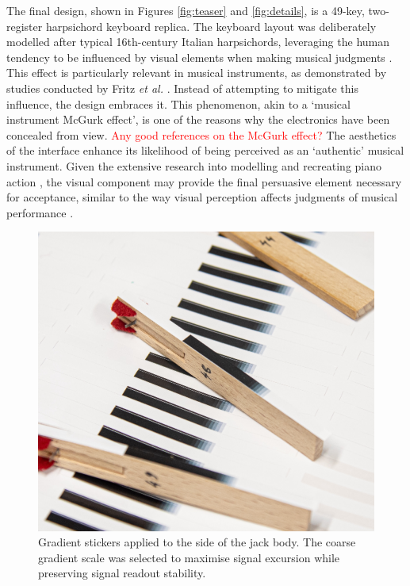 The final design, shown in Figures \ref{fig:teaser} and \ref{fig:details}, is a 49-key, two-register harpsichord keyboard replica. The keyboard layout was deliberately modelled after typical 16th-century Italian harpsichords, leveraging the human tendency to be influenced by visual elements when making musical judgments \cite{Tsay2013}. This effect is particularly relevant in musical instruments, as demonstrated by studies conducted by Fritz \emph{et al.} \cite{Fritz2012, Fritz2014, Fritz2017}. Instead of attempting to mitigate this influence, the design embraces it. This phenomenon, akin to a `musical instrument McGurk effect’, is one of the reasons why the electronics have been concealed from view. \textcolor{red}{Any good references on the McGurk effect?} The aesthetics of the interface enhance its likelihood of being perceived as an `authentic' musical instrument. Given the extensive research into modelling and recreating piano action \cite{Cadoz1990, Gillespie1996, Timmermans2020}, the visual component may provide the final persuasive element necessary for acceptance, similar to the way visual perception affects judgments of musical performance \cite{Tsay2013}.

\begin{figure}[!b]  
  \centering
  \includegraphics[width=0.9\linewidth]{src/images/tagging-jacks-3.jpg} 
  \caption{Gradient stickers applied to the side of the jack body. The coarse gradient scale was selected to maximise signal excursion while preserving signal readout stability.}
  \Description{} 
  \label{fig:jack-tags}
\end{figure}

